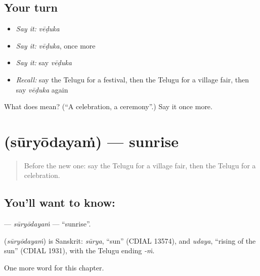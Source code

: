 \subsection*{Your turn}
\begin{itemize}
\raggedright
  \item \emph{Say it:} \emph{vēḍuka}
  \item \emph{Say it:} \emph{vēḍuka}, once more
  \item \emph{Say it:} say \emph{vēḍuka}
  \item \emph{Recall:} say the Telugu for a festival, then the Telugu for a village fair, then say \emph{vēḍuka} again
\end{itemize}

\begin{tcolorbox}[breakable,colback=teal!4,colframe=teal!35!black,title={Before you move on}]
What does  mean? (\textquotedblleft{}A celebration, a ceremony\textquotedblright{}.) Say it once more.
\end{tcolorbox}
\section[\texorpdfstring{\te{సూర్యోదయం} (sūryōdayaṁ)}{సూర్యోదయం (sūryōdayaṁ)}]{ (sūryōdayaṁ) — sunrise}

\label{lesson:TE-C289-suryodayam}



\begin{quote}
Before the new one: say the Telugu for a village fair, then the Telugu for a celebration.
\end{quote}

\subsection*{You'll want to know: }
\textbf{} — \emph{sūryōdayaṁ} — \textquotedblleft{}sunrise\textquotedblright{}.

\begin{cousinweb}
\textbf{} (\emph{sūryōdayaṁ}) is Sanskrit: \emph{sūrya}, \textquotedblleft{}sun\textquotedblright{} (CDIAL 13574), and \emph{udaya}, \textquotedblleft{}rising of the sun\textquotedblright{} (CDIAL 1931), with the Telugu ending \emph{-ṁ}.
\end{cousinweb}

\begin{grammarlens}[title={What you've built}]
One more word for this chapter.
\end{grammarlens}

